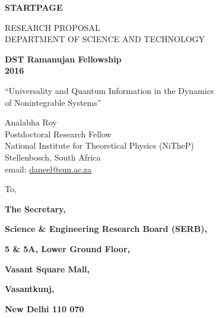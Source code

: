 \documentclass[a4paper,11pt,color]{article}
\def\Acronimo{Universality and  Quantum Information in the Dynamics\\ of Nonintegrable Systems}
\newenvironment{list1}{
  \begin{list}{\ding{113}}{%
      \setlength{\itemsep}{0in}
      \setlength{\parsep}{0in} \setlength{\parskip}{0in}
      \setlength{\topsep}{0in} \setlength{\partopsep}{0in} 
      \setlength{\leftmargin}{0.17in}}}{\end{list}}
\begin{document}


\phantom{a}
\vspace{15mm}
\begin{center}


        \Large{
      
     
        \textbf{STARTPAGE}
  
          \vspace{15mm}
          RESEARCH PROPOSAL\\
          DEPARTMENT OF SCIENCE AND TECHNOLOGY\\
          \vspace{1cm}
          
          \textbf{DST Ramanujan Fellowship}\\
          \textbf{2016}
          \vspace{2cm}                   

          
          \vspace{2cm}

          ``\Acronimo''
                    \vspace{2cm}

          Analabha Roy \\
          Postdoctoral Research Fellow \\
          National Institute for Theoretical Physics (NiTheP) \\
          Stellenbosch, South Africa \\
          email: \url{daneel@sun.ac.za}
        }

  \end{center}
\vspace{1cm}

\pagebreak
\begin{center}
\end{center}
To,\\
\begin{list1}
\item[] {\bf The Secretary,}
\item[] {\bf Science \& Engineering Research Board (SERB),}
\item[] {\bf 5 \& 5A, Lower Ground Floor,}
\item[] {\bf Vasant Square Mall,}
\item[] {\bf Vasantkunj,}
\item[] {\bf New Delhi 110 070}\\
\end{list1}
\end{document}

